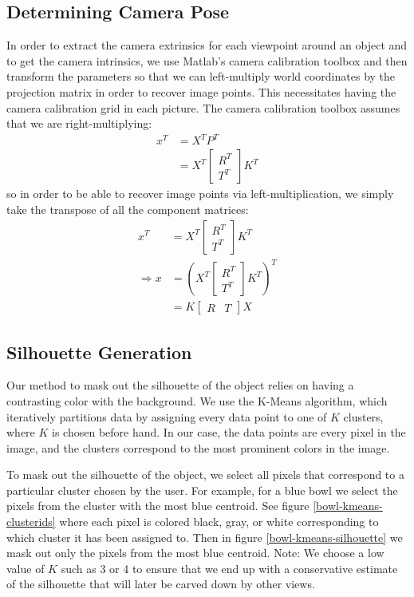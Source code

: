 \documentclass[10pt,twocolumn,letterpaper]{article}
\begin{document}
\subsection{Determining Camera Pose}

In order to extract the camera extrinsics for each viewpoint around an object and to get the camera intrinsics, we use Matlab's camera calibration toolbox and then transform the parameters so that we can left-multiply world coordinates by the projection matrix in order to recover image points. This necessitates having the camera calibration grid in each picture. The camera calibration toolbox assumes that we are right-multiplying:
\begin{align*}
    x^T &=  X^T P^T \\
    &= X^T \begin{bmatrix} R^T \\ T^T \end{bmatrix} K^T
\end{align*}
so in order to be able to recover image points via left-multiplication, we simply take the transpose of all the component matrices:
\begin{align*}
    x^T &= X^T \begin{bmatrix} R^T \\ T^T \end{bmatrix} K^T \\
    \Rightarrow x &= (X^T \begin{bmatrix} R^T \\ T^T \end{bmatrix} K^T)^T \\
    &= K \begin{bmatrix} R & T \end{bmatrix} X
\end{align*}
\subsection{Silhouette Generation}

Our method to mask out the silhouette of the object relies on having a contrasting color with the background. We use the K-Means algorithm, which iteratively partitions data by assigning every data point to one of $K$ clusters, where $K$ is chosen before hand. In our case, the data points are every pixel in the image, and the clusters correspond to the most prominent colors in the image.

To mask out the silhouette of the object, we select all pixels that correspond to a particular cluster chosen by the user. For example, for a blue bowl we select the pixels from the cluster with the most blue centroid. See figure \ref{bowl-kmeans-clusterids} where each pixel is colored black, gray, or white corresponding to which cluster it has been assigned to. Then in figure \ref{bowl-kmeans-silhouette} we mask out only the pixels from the most blue centroid. Note: We choose a low value of $K$ such as 3 or 4 to ensure that we end up with a conservative estimate of the silhouette that will later be carved down by other views.
\end{document}
